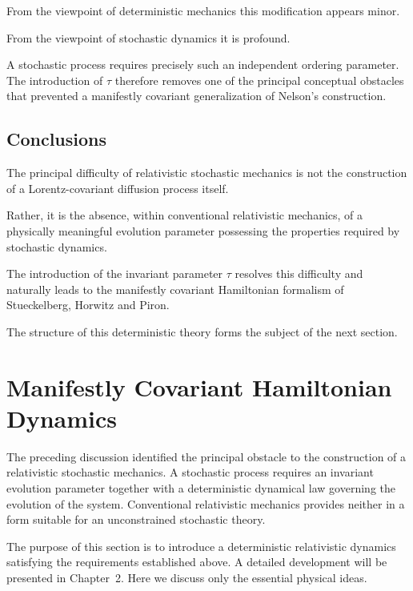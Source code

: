 From the viewpoint of deterministic mechanics this modification appears
minor.

From the viewpoint of stochastic dynamics it is profound.

A stochastic process requires precisely such an independent ordering
parameter. The introduction of \(\tau\) therefore removes one of the
principal conceptual obstacles that prevented a manifestly covariant
generalization of Nelson's construction.

\subsection{Conclusions}

The principal difficulty of relativistic stochastic mechanics is not the
construction of a Lorentz-covariant diffusion process itself.

Rather, it is the absence, within conventional relativistic mechanics,
of a physically meaningful evolution parameter possessing the properties
required by stochastic dynamics.

The introduction of the invariant parameter \(\tau\) resolves this
difficulty and naturally leads to the manifestly covariant Hamiltonian
formalism of Stueckelberg, Horwitz and Piron.

The structure of this deterministic theory forms the subject of the next
section.



\section{Manifestly Covariant Hamiltonian Dynamics}

The preceding discussion identified the principal obstacle to the
construction of a relativistic stochastic mechanics. A stochastic process
requires an invariant evolution parameter together with a deterministic
dynamical law governing the evolution of the system. Conventional
relativistic mechanics provides neither in a form suitable for an
unconstrained stochastic theory.

The purpose of this section is to introduce a deterministic relativistic
dynamics satisfying the requirements established above. A detailed
development will be presented in Chapter~2. Here we discuss only the
essential physical ideas.

